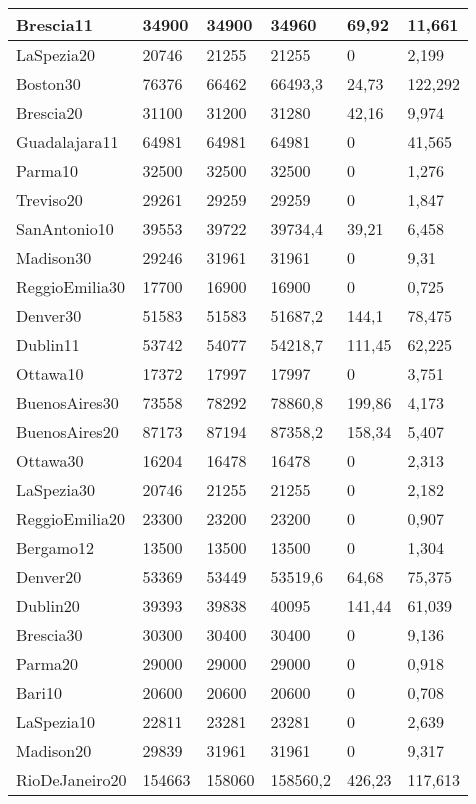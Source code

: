\begin{longtable}[c]{|l|l|l|l|l|l|}
Brescia11 & 34900 & 34900 & 34960 & 69,92 & 11,661 \\ \hline
LaSpezia20 & 20746 & 21255 & 21255 & 0 & 2,199 \\ \hline
Boston30 & 76376 & 66462 & 66493,3 & 24,73 & 122,292 \\ \hline
Brescia20 & 31100 & 31200 & 31280 & 42,16 & 9,974 \\ \hline
Guadalajara11 & 64981 & 64981 & 64981 & 0 & 41,565 \\ \hline
Parma10 & 32500 & 32500 & 32500 & 0 & 1,276 \\ \hline
Treviso20 & 29261 & 29259 & 29259 & 0 & 1,847 \\ \hline
SanAntonio10 & 39553 & 39722 & 39734,4 & 39,21 & 6,458 \\ \hline
Madison30 & 29246 & 31961 & 31961 & 0 & 9,31 \\ \hline
ReggioEmilia30 & 17700 & 16900 & 16900 & 0 & 0,725 \\ \hline
Denver30 & 51583 & 51583 & 51687,2 & 144,1 & 78,475 \\ \hline
Dublin11 & 53742 & 54077 & 54218,7 & 111,45 & 62,225 \\ \hline
Ottawa10 & 17372 & 17997 & 17997 & 0 & 3,751 \\ \hline
BuenosAires30 & 73558 & 78292 & 78860,8 & 199,86 & 4,173 \\ \hline
BuenosAires20 & 87173 & 87194 & 87358,2 & 158,34 & 5,407 \\ \hline
Ottawa30 & 16204 & 16478 & 16478 & 0 & 2,313 \\ \hline
LaSpezia30 & 20746 & 21255 & 21255 & 0 & 2,182 \\ \hline
ReggioEmilia20 & 23300 & 23200 & 23200 & 0 & 0,907 \\ \hline
Bergamo12 & 13500 & 13500 & 13500 & 0 & 1,304 \\ \hline
Denver20 & 53369 & 53449 & 53519,6 & 64,68 & 75,375 \\ \hline
Dublin20 & 39393 & 39838 & 40095 & 141,44 & 61,039 \\ \hline
Brescia30 & 30300 & 30400 & 30400 & 0 & 9,136 \\ \hline
Parma20 & 29000 & 29000 & 29000 & 0 & 0,918 \\ \hline
Bari10 & 20600 & 20600 & 20600 & 0 & 0,708 \\ \hline
LaSpezia10 & 22811 & 23281 & 23281 & 0 & 2,639 \\ \hline
Madison20 & 29839 & 31961 & 31961 & 0 & 9,317 \\ \hline
RioDeJaneiro20 & 154663 & 158060 & 158560,2 & 426,23 & 117,613 \\ \hline
\end{longtable}

